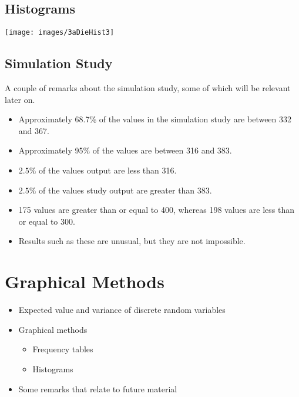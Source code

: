 \documentclass[]{report}
\begin{document}

{
\subsection{Histograms}

\begin{center}
\texttt{[image: images/3aDieHist3]}
\end{center}

}

{
\subsection{Simulation Study}
A couple of remarks about the simulation study, some of which will be relevant later on.
\begin{itemize}
\item Approximately 68.7\% of the values in the simulation study are between 332 and 367.
\item Approximately 95\% of the values are between 316 and 383.
\item $2.5\%$ of the values output are less than 316.
\item $2.5\%$ of the values study output are greater than 383.
\item 175 values are greater than or equal to 400, whereas 198 values are less than or equal to 300.
\item Results such as these are unusual, but they are not impossible.
\end{itemize}
}


\section{Graphical Methods}
\begin{itemize}
\item Expected value and variance of discrete random variables
\item Graphical methods
\begin{itemize}
\item Frequency tables
\item Histograms
\end{itemize}
\item Some remarks that relate to future material
\end{itemize}
\end{document}
